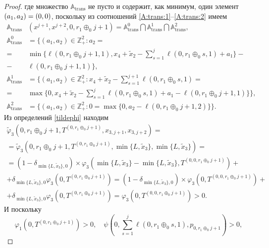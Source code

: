 \begin{proof}
где множество ${\mathbb A}_{\mathrm{trans}}$ не пусто и содержит,  как минимум,  один элемент $(a_1,  a_2)\hm=(0, 0)$,  поскольку из соотношений \eqref{A:trans:1}--\eqref{A:trans:2} имеем
\begin{align*}
{\mathbb A}_{\mathrm{trans}}&(x^{j+1},  x^{j+2},  0,  r_1 \oplus_0 j + 1) = {\mathbb A}_{\mathrm{trans}}^0 \bigcap {\mathbb A}_{\mathrm{trans}}^1\bigcap {\mathbb A}_{\mathrm{trans}}^2, \\
{\mathbb A}_{\mathrm{trans}}^0 &= \{(a_1,  a_2) \in \mathbb{Z}_+^2 \colon a_2 =\\=& \min{}\{\ell(0,  r_1 \oplus_0 j + 1,  1),  x_4 + \tilde{x}_2 - \sum_{s=1}^{j} \ell(0, r_1 \oplus_0 s, 1) + a_1\}  -\\
-&\ell(0, r_1 \oplus_0 j + 1, 1)\}, \\
{\mathbb A}_{\mathrm{trans}}^1 &= \{(a_1,  a_2) \in \mathbb{Z}_+^2 \colon x_4 + \tilde{x}_2 - \sum_{s=1}^{j + 1} \ell(0, r_1 \oplus_0 s, 1) =\\
=&\max{\{0,  x_4 + \tilde{x}_2 - \sum_{s=1}^{j} \ell(0, r_1 \oplus_0 s, 1) + a_1-\ell(0,  r_1 \oplus_0 j + 1,  1)\}}\}, \\
 {\mathbb A}_{\mathrm{trans}}^2 &= \{(a_1,  a_2) \in \mathbb{Z}_+^2 \colon  0 = \max{\{0,  a_2-\ell(0,  r_1 \oplus_0 j + 1,  2)\}}\}.
\end{align*}
Из определений \eqref{tildephi} находим
\begin{multline*}
\widetilde{\varphi}_3(0, r_1 \oplus_0 j + 1,  T^{(0, r_1 \oplus_0 j + 1)},  x_{3,  j+1}, x_{3,  j+2})=\\
=\widetilde{\varphi}_3(0, r_1 \oplus_0 j + 1,  T^{(0, r_1 \oplus_0 j + 1)},  \min\{L,  \tilde{x}_3\},  \min\{L,  \tilde{x}_3\})=\\
= (1-\delta_{\min\{L,  \tilde{x}_3\},  0}) \times \varphi_3(\min\{L,  \tilde{x}_3\} - \min\{L,  \tilde{x}_3\},  T^{(0,  0, r_1 \oplus_0 j + 1)} ) +\\
+\delta_{\min\{L,  \tilde{x}_3\},  0} \varphi_3 (0,  T^{(0, r_1 \oplus_0 j + 1)}) = (1-\delta_{\min\{L,  \tilde{x}_3\},  0}) \times \varphi_3(0,  T^{(0,  0, r_1 \oplus_0 j + 1)} ) +\\
+\delta_{\min\{L,  \tilde{x}_3\},  0} \varphi_3 (0,  T^{(0, r_1 \oplus_0 j + 1)}) = \varphi_3(0,  T^{(0,  0, r_1 \oplus_0 j + 1)} ) > 0.
\end{multline*}
И поскольку 
\begin{equation*}
\varphi_1(0,  T^{(0,  r_1 \oplus_0 j +  1)}) > 0,  \quad \psi(0,  \sum_{s=1}^{j} \ell(0, r_1 \oplus_0 s, 1),  p_{0,  r_1 \oplus_0 j+1}) > 0, 

\end{equation*}
\end{proof}
